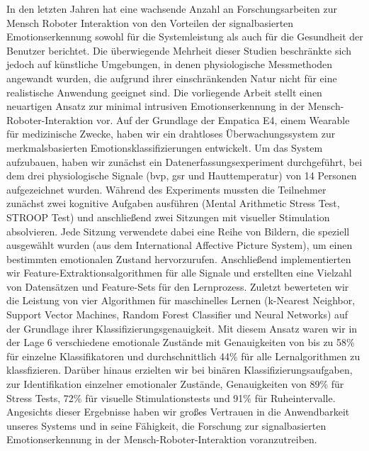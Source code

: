 

In den letzten Jahren hat eine wachsende Anzahl an Forschungsarbeiten zur Mensch Roboter Interaktion von den Vorteilen der signalbasierten Emotionserkennung sowohl für die Systemleistung als auch für die Gesundheit der Benutzer berichtet. Die überwiegende Mehrheit dieser Studien beschränkte sich jedoch auf künstliche Umgebungen, in denen physiologische Messmethoden angewandt wurden, die aufgrund ihrer einschränkenden Natur nicht für eine realistische Anwendung geeignet sind.
Die vorliegende Arbeit stellt einen neuartigen Ansatz zur minimal intrusiven Emotionserkennung in der Mensch-Roboter-Interaktion vor. Auf der Grundlage der  Empatica E4, einem Wearable für medizinische Zwecke, haben wir ein drahtloses Überwachungssystem zur merkmalsbasierten Emotionsklassifizierungen entwickelt.
Um das System aufzubauen, haben wir zunächst ein Datenerfassungsexperiment durchgeführt, bei dem drei physiologische Signale (\gls{bvp}, \gls{gsr} und Hauttemperatur) von 14 Personen aufgezeichnet wurden. Während des Experiments mussten die Teilnehmer zunächst zwei kognitive Aufgaben ausführen (Mental Arithmetic Stress Test, STROOP Test) und anschließend zwei Sitzungen mit visueller Stimulation absolvieren. Jede Sitzung verwendete dabei eine Reihe von Bildern, die speziell ausgewählt wurden (aus dem International Affective Picture System), um einen bestimmten emotionalen Zustand hervorzurufen.
Anschließend implementierten wir Feature-Extraktionsalgorithmen für alle Signale und erstellten eine Vielzahl von Datensätzen und Feature-Sets für den Lernprozess.
Zuletzt bewerteten wir die Leistung von vier Algorithmen für maschinelles Lernen (k-Nearest Neighbor, Support Vector Machines, Random Forest Classifier und Neural Networks) auf der Grundlage ihrer Klassifizierungsgenauigkeit.
Mit diesem Ansatz waren wir in der Lage 6 verschiedene emotionale Zustände mit Genauigkeiten von bis zu 58\% für einzelne Klassifikatoren und durchschnittlich 44\% für alle Lernalgorithmen zu klassfizieren.
Darüber hinaus erzielten wir bei binären Klassifizierungsaufgaben, zur Identifikation einzelner emotionaler Zustände, Genauigkeiten von 89\% für Stress Tests, 72\% für visuelle Stimulationstests und 91\% für Ruheintervalle.
Angesichts dieser Ergebnisse haben wir großes Vertrauen in die Anwendbarkeit unseres Systems und in seine Fähigkeit, die Forschung zur signalbasierten Emotionserkennung in der Mensch-Roboter-Interaktion voranzutreiben.